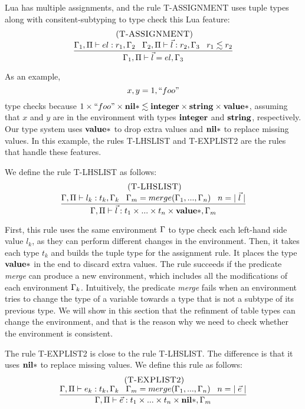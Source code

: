 Lua has multiple assignments, and the rule \textsc{T-ASSIGNMENT} uses
tuple types along with consitent-subtyping to type check this Lua feature:
\[
\begin{array}{c}
\; (\textsc{T-ASSIGNMENT})\\
\begin{array}{c}
\dfrac{\Gamma_{1}, \Pi \vdash el:r_{1}, \Gamma_{2} \;\;\;
       \Gamma_{2}, \Pi \vdash \vec{l}:r_{2}, \Gamma_{3} \;\;\;
       r_{1} \lesssim r_{2}}
      {\Gamma_{1}, \Pi \vdash \vec{l} = el,\Gamma_{3}}
\end{array}
\end{array}
\]

As an example,
\[
x, y = 1, ``foo"
\]
type checks because
$1 \times ``foo" \times \mathbf{nil}{*} \lesssim \mathbf{integer} \times \mathbf{string} \times \mathbf{value}{*}$,
assuming that $x$ and $y$ are in the environment with
types $\mathbf{integer}$ and $\mathbf{string}$, respectively.
Our type system uses $\mathbf{value}{*}$ to drop extra values
and $\mathbf{nil}{*}$ to replace missing values.
In this example, the rules \textsc{T-LHSLIST} and \textsc{T-EXPLIST2}
are the rules that handle these features.

We define the rule \textsc{T-LHSLIST} as follows:
\[
\begin{array}{c}
\; (\textsc{T-LHSLIST})\\
\dfrac{\Gamma, \Pi \vdash l_{k}:t_{k}, \Gamma_{k} \;\;\;
       \Gamma_{m} = merge(\Gamma_{1}, ..., \Gamma_{n}) \;\;\;
       n = |\;\vec{l}\;|}
      {\Gamma, \Pi \vdash \vec{l}:t_{1} \times ... \times t_{n} \times \mathbf{value}{*}, \Gamma_{m}}
\end{array}
\]

First, this rule uses the same environment $\Gamma$ to type check each
left-hand side value $l_{k}$, as they can perform different changes
in the environment.
Then, it takes each type $t_{k}$ and builds the tuple type for
the assignment rule.
It places the type $\mathbf{value}{*}$ in the end to discard extra values.
The rule succeeds if the predicate \emph{merge} can
produce a new environment, which includes all the modifications
of each environment $\Gamma_{k}$.
Intuitively, the predicate \emph{merge} fails when an environment
tries to change the type of a variable towards a type that is not
a subtype of its previous type.
We will show in this section that the refinment of table types can
change the environment, and that is the reason why we need to check
whether the environment is consistent.

The rule \textsc{T-EXPLIST2} is close to the rule \textsc{T-LHSLIST}.
The difference is that it uses $\mathbf{nil}{*}$ to replace missing values.
We define this rule as follows:
\[
\begin{array}{c}
\; (\textsc{T-EXPLIST2})\\
\dfrac{\Gamma, \Pi \vdash e_{k}:t_{k}, \Gamma_{k} \;\;\;
       \Gamma_{m} = merge(\Gamma_{1}, ..., \Gamma_{n}) \;\;\;
       n = |\;\vec{e}\;|}
      {\Gamma, \Pi \vdash \vec{e}:t_{1} \times ... \times t_{n} \times \mathbf{nil}{*}, \Gamma_{m}}
\end{array}
\]


